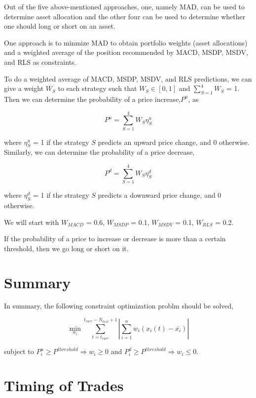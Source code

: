 \documentclass{article}
\begin{document}
Out of the five above-mentioned approaches, one, namely MAD, can be
used to determine asset allocation and the other four can be used to
determine whether one should long or short on an asset. 

One approach is to minmize MAD to obtain portfolio weights (asset
allocations) and a weighted average of the position recommended by
MACD, MSDP, MSDV, and RLS as constraints.

To do a weighted average of MACD, MSDP, MSDV, and RLS predictions, we
can give a weight $W_{S}$ to each strategy such that $W_{S} \in [0,1]$
and $\sum_{S=1}^{4} W_{S}$ = 1. Then we can determine the probability
of a price increase,$P^{u}$, as

\begin{equation}\label{eqn:increase-prob}
P^{u} = \sum_{S=1}^{4} W_{S} \eta_{S}^{u} 
\end{equation}

where $\eta_{S}^{u}$ = 1 if the strategy $S$ predicts an upward price
change, and 0 otherwise. Similarly, we can determine the probability
of a price decrease,

\begin{equation}\label{eqn:increase-prob}
P^{d} = \sum_{S=1}^{4} W_{S} \eta_{S}^{d} 
\end{equation}

where $\eta_{S}^{d}$ = 1 if the strategy $S$ predicts a downward price
change, and 0 otherwise.

We will start with $W_{MACD}$ = 0.6, $W_{MSDP}$ = 0.1, $W_{MSDV}$ =
0.1, $W_{RLS}$ = 0.2.

If the probability of a price to increase or decrease is more than a
certain threshold, then we go long or short on it.

\section{Summary}

In summary, the following constraint optimization problm should be
solved,

\begin{equation}\label{eqn:summary}
\min_{w_{i}} \sum_{t=t_{curr}}^{t_{curr}-N_{hist}+1} |\sum_{i=1}^{n} w_{i} (x_{i}(t)-\bar{x_{i}})|
\end{equation}

subject to $P^{u}_{i} \geq P^{threshold} \Rightarrow w_{i} \geq 0$ and
$P^{d}_{i} \geq P^{threshold} \Rightarrow w_{i} \leq 0$.

\section{Timing of Trades}\label{section:timing}
\end{document}
